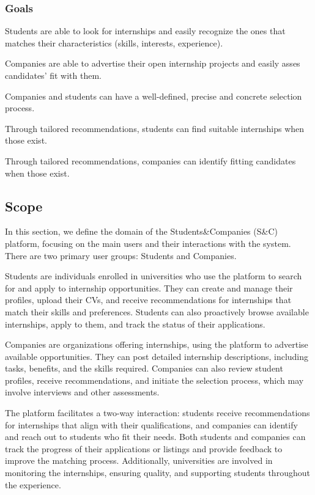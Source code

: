 \subsubsection{Goals}
\begin{enumerate}[label={[G\arabic*]}]
    \item Students are able to look for internships and easily recognize the ones that matches their characteristics (skills, interests, experience).
    \item Companies are able to advertise their open internship projects and easily asses candidates' fit with them.
    \item Companies and students can have a well-defined, precise and concrete selection process.
    \item Through tailored recommendations, students can find suitable internships when those exist.
    \item Through tailored recommendations, companies can identify fitting candidates when those exist.
\end{enumerate}

\subsection{Scope}
In this section, we define the domain of the Students\&Companies (S\&C) platform, focusing on the main users and their interactions with the system. There are two primary user groups: Students and Companies.

Students are individuals enrolled in universities who use the platform to search for and apply to internship opportunities. They can create and manage their profiles, upload their CVs, and receive recommendations for internships that match their skills and preferences. Students can also proactively browse available internships, apply to them, and track the status of their applications.

Companies are organizations offering internships, using the platform to advertise available opportunities. They can post detailed internship descriptions, including tasks, benefits, and the skills required. Companies can also review student profiles, receive recommendations, and initiate the selection process, which may involve interviews and other assessments.

The platform facilitates a two-way interaction: students receive recommendations for internships that align with their qualifications, and companies can identify and reach out to students who fit their needs. Both students and companies can track the progress of their applications or listings and provide feedback to improve the matching process. Additionally, universities are involved in monitoring the internships, ensuring quality, and supporting students throughout the experience.
